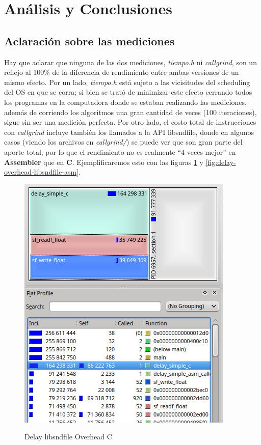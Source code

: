 \section{Análisis y Conclusiones}
\label{sec:analisis}

\subsection*{Aclaración sobre las mediciones}
Hay que aclarar que ninguna de las dos mediciones, \textit{tiempo.h} ni \textit{callgrind}, son un reflejo al 100\% de la diferencia de rendimiento entre ambas versiones de un mismo efecto. Por un lado, \textit{tiempo.h} está sujeto a las vicisitudes del scheduling del OS en que se corra; si bien se trató de minimizar este efecto cerrando todos los programas en la computadora donde se estaban realizando las mediciones, además de corriendo los algoritmos una gran cantidad de veces (100 iteraciones), sigue sin ser una medición perfecta. 
Por otro lado, el costo total de instrucciones con \textit{callgrind} incluye también los llamados a la API libsndfile, donde en algunos casos (viendo los archivos en \textit{callgrind/}) se puede ver que son gran parte del aporte total, por lo que el rendimiento no es realmente ``4 veces mejor'' en \textbf{Assembler} que en \textbf{C}. Ejemplificaremos esto con las figuras \ref{fig:delay-overhead-libsndfile} y \ref{fig:delay-overhead-libsndfile-asm}.

\begin{figure}[H]
    \centering
    \includegraphics[scale=0.7]{imagenes/delay-overhead-libsndfile.png}
    \label{fig:delay-overhead-libsndfile}
    \caption{Delay libsndfile Overhead C}
\end{figure}

